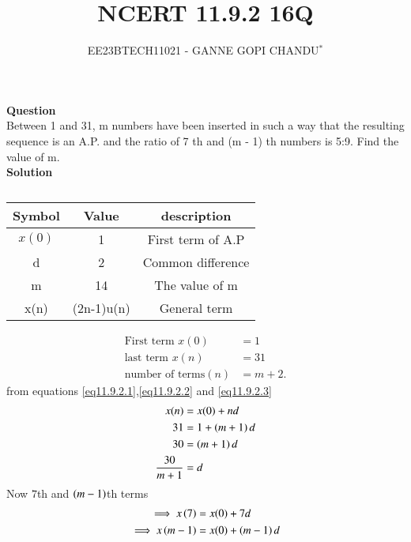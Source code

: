 \documentclass[journal,12pt,twocolumn]{IEEEtran}
\theoremstyle{remark}
\begin{document}

\vspace{3cm}
\title{NCERT 11.9.2 16Q}
\author{EE23BTECH11021 - GANNE GOPI CHANDU$^{*}$%
}
\maketitle
\newpage
\bigskip
\renewcommand{\thefigure}{\theenumi}
\renewcommand{\thetable}{\theenumi}

\textbf{Question}\\
Between 1 and 31, m numbers have been inserted in such a way that the resulting sequence is an A.P. and 
the ratio of 7
th and (m - 1)
th numbers is 5:9. Find the value of m.\\
\textbf{Solution}\\
\begin{table}[h!]
\begin{center}
\renewcommand\thetable{1}
\begin{tabular}{ |c|c|c| } 
  \hline
    Symbol & Value & description \\ 
  \hline
  $x(0)$ & 1 & First term of A.P  \\ 
  \hline
  d & 2 & Common difference \\ 
  \hline
  m & 14 & The value of m \\
  \hline
  x(n) & (2n-1)u(n) & General term \\
  \hline
\end{tabular}
\end{center}
\caption{}
\end{table}
\begin{align}
\text{First term } x(0) &= 1\label{eq11.9.2.1}\\
\text{last term } x(n) &= 31\label{eq11.9.2.2}\\
\text{number of terms}( n) &= m + 2.\label{eq11.9.2.3}
\end{align}
from equations \ref{eq11.9.2.1},\ref{eq11.9.2.2} and \ref{eq11.9.2.3}\\
\begin{align}
x(n)&=x(0)+nd\\
31 &= 1 + \left(m + 1\right)d \\
30 &= \left(m + 1\right)d \\
\frac{30}{m + 1} &= d \label{eq11.9.2.7}
\end{align}
Now $7$th and $\left(m-1\right)$th terms
\begin{align}
\implies x\left(7\right) &= x(0) + 7d\label{eq11.9.2.8}\\
\implies x\left(m-1\right) &= x(0) + \left(m-1\right)d\label{eq11.9.2.9}
\end{align}
\end{document}
